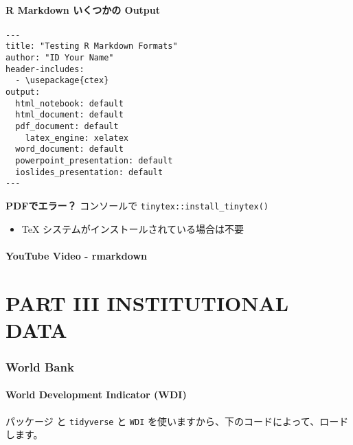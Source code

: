 \documentclass[
]{bxjsbook}
\providecommand{\tightlist}{%
  \setlength{\itemsep}{0pt}\setlength{\parskip}{0pt}}
\theoremstyle{definition}
\theoremstyle{definition}
\theoremstyle{definition}
\theoremstyle{definition}
\theoremstyle{remark}
\begin{document}
\hypertarget{r-markdown-ux3044ux304fux3064ux304bux306e-output}{%
\subsection{R Markdown いくつかの Output}\label{r-markdown-ux3044ux304fux3064ux304bux306e-output}}

\begin{verbatim}
---
title: "Testing R Markdown Formats"
author: "ID Your Name"
header-includes:
  - \usepackage{ctex}
output:
  html_notebook: default
  html_document: default
  pdf_document: default
    latex_engine: xelatex
  word_document: default
  powerpoint_presentation: default
  ioslides_presentation: default
---
\end{verbatim}

\textbf{PDFでエラー？} コンソールで \texttt{tinytex::install\_tinytex()}

\begin{itemize}
\tightlist
\item
  TeX システムがインストールされている場合は不要
\end{itemize}

\hypertarget{youtube-video---rmarkdown}{%
\subsection{YouTube Video - rmarkdown}\label{youtube-video---rmarkdown}}

\hypertarget{part-part-iii-institutional-data}{%
\part{PART III INSTITUTIONAL DATA}\label{part-part-iii-institutional-data}}

\hypertarget{worldbank}{%
\section{World Bank}\label{worldbank}}

\hypertarget{world-development-indicator-wdi}{%
\subsection{World Development Indicator (WDI)}\label{world-development-indicator-wdi}}

パッケージ と \texttt{tidyverse} と \texttt{WDI} を使いますから、下のコードによって、ロードします。
\end{document}
